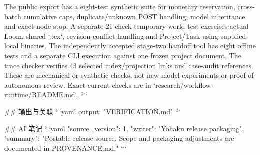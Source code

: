 The public export has a eight-test synthetic suite for monetary reservation, cross-batch cumulative caps, duplicate/unknown POST handling, model inheritance and exact-node stop. A separate 21-check temporary-world test exercises actual Loom, shared `.tex`, revision conflict handling and Project/Task using supplied local binaries. The independently accepted stage-two handoff tool has eight offline tests and a separate CLI execution against one frozen project document. The trace checker verifies 43 selected index/projection links and case-audit references. These are mechanical or synthetic checks, not new model experiments or proof of autonomous review. Exact current checks are in `research/workflow-runtime/README.md`.
````

## 输出与关联
```yaml
output: "VERIFICATION.md"
```

## AI 笔记
```yaml
{"source_version": 1, "writer": "Yohaku release packaging", "summary": "Portable release source. Scope and packaging adjustments are documented in PROVENANCE.md."}
```

